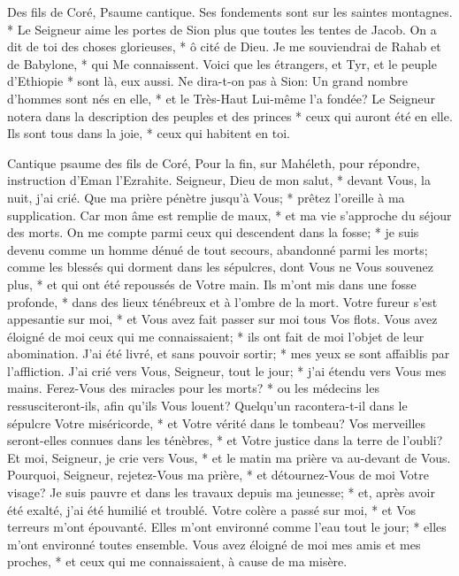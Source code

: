 Des fils de Coré, Psaume cantique. Ses fondements sont sur les saintes montagnes. *
Le Seigneur aime les portes de Sion plus que toutes les tentes de Jacob.
On a dit de toi des choses glorieuses, * ô cité de Dieu.
Je me souviendrai de Rahab et de Babylone, * qui Me connaissent. Voici que les étrangers, et Tyr, et le peuple d'Ethiopie * sont là, eux aussi.
Ne dira-t-on pas à Sion: Un grand nombre d'hommes sont nés en elle, * et le Très-Haut Lui-même l'a fondée?
Le Seigneur notera dans la description des peuples et des princes * ceux qui auront été en elle.
Ils sont tous dans la joie, * ceux qui habitent en toi.

Cantique psaume des fils de Coré, Pour la fin, sur Mahéleth, pour répondre, instruction d'Eman l'Ezrahite.
Seigneur, Dieu de mon salut, * devant Vous, la nuit, j'ai crié.
Que ma prière pénètre jusqu'à Vous; * prêtez l'oreille à ma supplication.
Car mon âme est remplie de maux, * et ma vie s'approche du séjour des morts.
On me compte parmi ceux qui descendent dans la fosse; * je suis devenu comme un homme dénué de tout secours,
abandonné parmi les morts; comme les blessés qui dorment dans les sépulcres, dont Vous ne Vous souvenez plus, * et qui ont été repoussés de Votre main.
Ils m'ont mis dans une fosse profonde, * dans des lieux ténébreux et à l'ombre de la mort.
Votre fureur s'est appesantie sur moi, * et Vous avez fait passer sur moi tous Vos flots.
Vous avez éloigné de moi ceux qui me connaissaient; * ils ont fait de moi l'objet de leur abomination. J'ai été livré, et sans pouvoir sortir; *
mes yeux se sont affaiblis par l'affliction. J'ai crié vers Vous, Seigneur, tout le jour; * j'ai étendu vers Vous mes mains.
Ferez-Vous des miracles pour les morts? * ou les médecins les ressusciteront-ils, afin qu'ils Vous louent?
Quelqu'un racontera-t-il dans le sépulcre Votre miséricorde, * et Votre vérité dans le tombeau?
Vos merveilles seront-elles connues dans les ténèbres, * et Votre justice dans la terre de l'oubli?
Et moi, Seigneur, je crie vers Vous, * et le matin ma prière va au-devant de Vous.
Pourquoi, Seigneur, rejetez-Vous ma prière, * et détournez-Vous de moi Votre visage?
Je suis pauvre et dans les travaux depuis ma jeunesse; * et, après avoir été exalté, j'ai été humilié et troublé.
Votre colère a passé sur moi, * et Vos terreurs m'ont épouvanté.
Elles m'ont environné comme l'eau tout le jour; * elles m'ont environné toutes ensemble.
Vous avez éloigné de moi mes amis et mes proches, * et ceux qui me connaissaient, à cause de ma misère.

